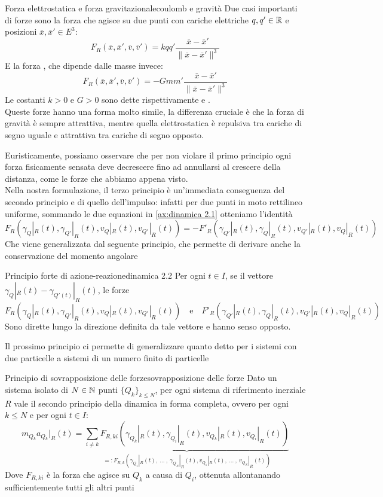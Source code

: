 \documentclass[openany]{book}
\begin{document}
\begin{example}{Forza elettrostatica e forza gravitazionale}{coulomb e gravità}
    Due casi importanti di forze sono la forza  che agisce su due punti con cariche elettriche $q, q' \in \mathbb{R}$ e posizioni $\bar x, \bar x' \in E^3$:
    \[ F_R(\bar x, \bar x', \bar v, \bar v') = k q q' \frac{ \bar x-\bar x' }{\| \bar x - \bar x' \|^3} \]
    E la forza , che dipende dalle masse invece:
    \[ F_R(\bar x, \bar x', \bar v, \bar v') = -G m m' \frac{ \bar x-\bar x' }{\| \bar x - \bar x' \|^3} \]
    Le costanti $k>0$ e $G>0$ sono dette rispettivamente  e .\\
    Queste forze hanno una forma molto simile, la differenza cruciale è che la forza di gravità è sempre attrattiva, mentre quella elettrostatica è repulsiva tra cariche di segno uguale e attrattiva tra cariche di segno opposto.
\end{example}

Euristicamente, possiamo osservare che per non violare il primo principio ogni forza fisicamente sensata deve decrescere fino ad annullarsi al crescere della distanza, come le forze che abbiamo appena visto.\\
Nella nostra formulazione, il terzo principio è un'immediata conseguenza del secondo principio e di quello dell'impulso: infatti per due punti in moto rettilineo uniforme, sommando le due equazioni in \cref{ax:dinamica 2.1} otteniamo l'identità
\[ F_R(\gamma_Q|_R(t), \gamma_{Q'}|_R(t), v_Q|_R(t), v_{Q'}|_R(t)) = - F'_R(\gamma_{Q'}|_R(t), \gamma_{Q}|_R(t), v_{Q'}|_R(t), v_{Q}|_R(t))\]
Che viene generalizzata dal seguente principio, che permette di derivare anche la conservazione del momento angolare

\begin{axiom}{Principio forte di azione-reazione}{dinamica 2.2}
    Per ogni $t \in I$, se il vettore $\gamma_Q|_R(t) - \gamma_{Q'(t)}|_R(t)$, le forze 
    \[ F_R(\gamma_Q|_R(t), \gamma_{Q'}|_R(t), v_Q|_R(t), v_{Q'}|_R(t)) \quad\text{e}\quad F'_R(\gamma_{Q'}|_R(t), \gamma_{Q}|_R(t), v_{Q'}|_R(t), v_{Q}|_R(t)) \]
    Sono dirette lungo la direzione definita da tale vettore e hanno senso opposto.
\end{axiom}

Il prossimo principio ci permette di generalizzare quanto detto per i sistemi con due particelle a sistemi di un numero finito di particelle

\begin{axiom}{Principio di sovrapposizione delle forze}{sovrapposizione delle forze}
    Dato un sistema isolato di $N \in \mathbb{N}$ punti $\{Q_k\}_{k\le N}$, per ogni sistema di riferimento inerziale $R$ vale il secondo principio della dinamica in forma completa, ovvero per ogni $k\le N$ e per ogni $t \in I$:
    \[ m_{Q_k}a_{Q_k}|_R(t) = \underbrace{\sum_{i\neq k} F_{R,ki} (\gamma_{Q_k}|_R(t), \gamma_{Q_i}|_R(t), v_{Q_k}|_R(t), v_{Q_i}|_R(t)) }_{=: F_{R,k}(\gamma_{Q_1}|_R(t),\ ...\ ,\ \gamma_{Q_N}|_R(t),v_{Q_1}|_R(t),\ ...\ ,\  v_{Q_N}|_R(t)) } \]
    Dove $F_{R,ki}$ è la forza che agisce su $Q_k$ a causa di $Q_i$, ottenuta allontanando sufficientemente tutti gli altri punti
\end{axiom}
\end{document}
